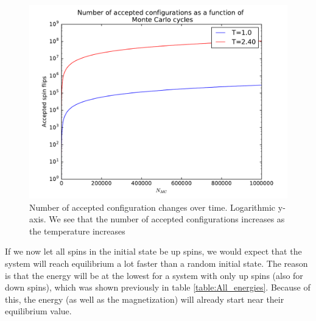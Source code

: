 \documentclass[12pt]{article}
\begin{document}
\begin{figure}[H]
\centering
\includegraphics[width=\linewidth]{Plots/Accepted_configurations_wrt_MC_cycles.pdf}
\caption{Number of accepted configuration changes over time. Logarithmic y-axis. We see that the number of accepted configurations increases as the temperature increases}
\label{fig:Accepted_configs_wrt_MC_cycles}
\end{figure}
If we now let all spins in the initial state be up spins, we would expect that the system will reach equilibrium a lot faster than a random initial state. The reason is that the energy will be at the lowest for a system with only up spins (also for down spins), which was shown previously in table \ref{table:All_energies}. Because of this, the energy (as well as the magnetization) will already start near their equilibrium value.
\end{document}
